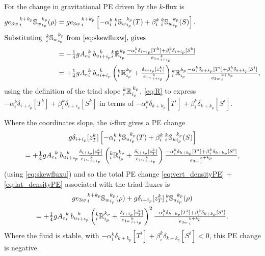 \documentclass[../tex_main/NEMO_manual]{subfiles}
\begin{document}
For the change in gravitational PE driven by the $k$-flux is
\begin{align}
  \label{eq:vert_densityPE}
  g {e_{3w}}_{\,i}^{\,k+k_p}{\mathbb{S}_w}_{i_p}^{k_p} (\rho)
  &=g {e_{3w}}_{\,i}^{\,k+k_p}\left[-\alpha _i^k {\:}_i^k
    {\mathbb{S}_w}_{i_p}^{k_p} (T) + \beta_i^k {\:}_i^k
    {\mathbb{S}_w}_{i_p}^{k_p} (S) \right]. \notag \\
\intertext{Substituting  ${\:}_i^k {\mathbb{S}_w}_{i_p}^{k_p}$ from
  \autoref{eq:skewfluxw}, gives}
 &=-\quarter g{A_e}_i^k{\: }{b_u}_{i+i_p}^k {_i^k\tilde{\mathbb{R}}_{i_p}^{k_p}}
\frac{ -\alpha _i^k\delta_{i+ i_p}[T^k]+ \beta_i^k\delta_{i+ i_p}[S^k]} { {e_{1u}}_{\,i + i_p}^{\,k} } \notag \\
 &=+\quarter g{A_e}_i^k{\: }{b_u}_{i+i_p}^k
     \left({_i^k\mathbb{R}_{i_p}^{k_p}}+\frac{\delta_{i+i_p}[z_T^k]}{{e_{1u}}_{\,i + i_p}^{\,k}}\right) {_i^k\mathbb{R}_{i_p}^{k_p}}
\frac{-\alpha_i^k \delta_{k+ k_p}[T^i]+ \beta_i^k\delta_{k+ k_p}[S^i]} {{e_{3w}}_{\,i}^{\,k+k_p}},
\end{align}
using the definition of the triad slope ${}_{i}^{k}{\mathbb{R}_{}}_{i_p}^{\,k_p}$, \autoref{eq:R} to
express $-\alpha _i^k\delta_{i+ i_p}[T^k]+\beta_i^k\delta_{i+ i_p}[S^k]$ in terms of
$-\alpha_i^k \delta_{k+ k_p}[T^i]+ \beta_i^k\delta_{k+ k_p}[S^i]$.

Where the coordinates slope, the $i$-flux gives a PE change
\begin{multline}
  \label{eq:lat_densityPE}
 g \delta_{i+i_p}[z_T^k]
\left[
-\alpha _i^k {\:}_i^k {\mathbb{S}_u}_{i_p}^{k_p} (T) + \beta_i^k {\:}_i^k {\mathbb{S}_u}_{i_p}^{k_p} (S)
\right] \\
= +\textstyle\frac{1}{4} g{A_e}_i^k{\: }{b_u}_{i+i_p}^k
     \frac{\delta_{i+i_p}[z_T^k]}{{e_{1u}}_{\,i + i_p}^{\,k}}
\left({_i^k\mathbb{R}_{i_p}^{k_p}}+\frac{\delta_{i+i_p}[z_T^k]}{{e_{1u}}_{\,i + i_p}^{\,k}}\right)
\frac{-\alpha_i^k \delta_{k+ k_p}[T^i]+ \beta_i^k\delta_{k+ k_p}[S^i]} {{e_{3w}}_{\,i}^{\,k+k_p}},
\end{multline}
(using \autoref{eq:skewfluxu}) and so the total PE change \autoref{eq:vert_densityPE} +
\autoref{eq:lat_densityPE} associated with the triad fluxes is
\begin{multline}
  \label{eq:tot_densityPE}
  g{e_{3w}}_{\,i}^{\,k+k_p}{\mathbb{S}_w}_{i_p}^{k_p} (\rho) +
g\delta_{i+i_p}[z_T^k] {\:}_i^k {\mathbb{S}_u}_{i_p}^{k_p} (\rho) \\
= +\textstyle\frac{1}{4} g{A_e}_i^k{\: }{b_u}_{i+i_p}^k
     \left({_i^k\mathbb{R}_{i_p}^{k_p}}+\frac{\delta_{i+i_p}[z_T^k]}{{e_{1u}}_{\,i + i_p}^{\,k}}\right)^2
\frac{-\alpha_i^k \delta_{k+ k_p}[T^i]+ \beta_i^k\delta_{k+ k_p}[S^i]} {{e_{3w}}_{\,i}^{\,k+k_p}}.
\end{multline}
Where the fluid is stable, with $-\alpha_i^k \delta_{k+ k_p}[T^i]+
\beta_i^k\delta_{k+ k_p}[S^i]<0$, this PE change is negative.
\end{document}
